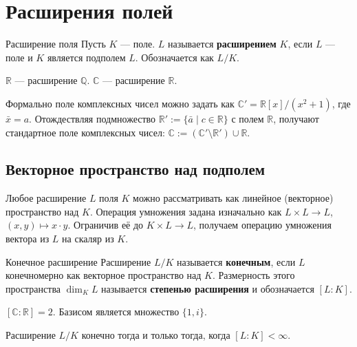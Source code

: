 
\section{Расширения полей}

\begin{Definition}{Расширение поля}{}
	Пусть $K$ --- поле. $L$ называется \textbf{расширением} $K$, если $L$ --- поле и $K$ является подполем $L$. Обозначается как $L/K$.
\end{Definition}

\begin{Example}{}{}
	$\mathbb{R}$ --- расширение $\mathbb{Q}$. $\mathbb{C}$ --- расширение $\mathbb{R}$.
\end{Example}

\begin{Remark}{}{}
	Формально поле комплексных чисел можно задать как $\mathbb{C}' = \mathbb{R}[x]/(x^2+1)$, где $\bar{x} = a$. 
	Отождествляя подмножество $\mathbb{R}' := \{ \bar{a} \mid c \in \mathbb{R} \}$ с полем $\mathbb{R}$, получают стандартное поле комплексных чисел: $\mathbb{C} := (\mathbb{C}' \setminus \mathbb{R}') \cup \mathbb{R}$.
\end{Remark}

\subsection{Векторное пространство над подполем}

Любое расширение $L$ поля $K$ можно рассматривать как линейное (векторное) пространство над $K$. 
Операция умножения задана изначально как $L \times L \to L$, $(x,y) \mapsto x \cdot y$. Ограничив её до $K \times L \to L$, получаем операцию умножения вектора из $L$ на скаляр из $K$.

\begin{Definition}{Конечное расширение}{}
	Расширение $L/K$ называется \textbf{конечным}, если $L$ конечномерно как векторное пространство над $K$.
	Размерность этого пространства $\dim_K L$ называется \textbf{степенью расширения} и обозначается $[L:K]$.
\end{Definition}

\begin{Example}{}{}
	$[\mathbb{C}:\mathbb{R}] = 2$. Базисом является множество $\{1, i\}$.
\end{Example}

\begin{Statement}{}{}
	Расширение $L/K$ конечно тогда и только тогда, когда $[L:K] < \infty$.
\end{Statement}

